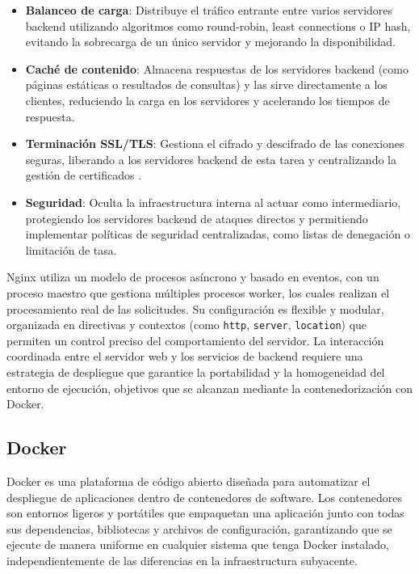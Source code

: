\documentclass{article}
\begin{document}
\begin{itemize}
\item \textbf{Balanceo de carga}: Distribuye el tráfico entrante entre varios servidores backend utilizando algoritmos como round-robin, least connections o IP hash, evitando la sobrecarga de un único servidor y mejorando la disponibilidad.
\item \textbf{Caché de contenido}: Almacena respuestas de los servidores backend (como páginas estáticas o resultados de consultas) y las sirve directamente a los clientes, reduciendo la carga en los servidores y acelerando los tiempos de respuesta.
\item \textbf{Terminación SSL/TLS}: Gestiona el cifrado y descifrado de las conexiones seguras, liberando a los servidores backend de esta tarea y centralizando la gestión de certificados .
\item \textbf{Seguridad}: Oculta la infraestructura interna al actuar como intermediario, protegiendo los servidores backend de ataques directos y permitiendo implementar políticas de seguridad centralizadas, como listas de denegación o limitación de tasa.

\end{itemize}

Nginx utiliza un modelo de procesos asíncrono y basado en eventos, con un proceso maestro que gestiona múltiples procesos worker, los cuales realizan el procesamiento real de las solicitudes. Su configuración es flexible y modular, organizada en directivas y contextos (como \texttt{http}, \texttt{server}, \texttt{location}) que permiten un control preciso del comportamiento del servidor.
La interacción coordinada entre el servidor web y los servicios de backend requiere una estrategia de despliegue que garantice la portabilidad y la homogeneidad del entorno de ejecución, objetivos que se alcanzan mediante la contenedorización con Docker.

\subsection{Docker}

Docker\cite{docker} es una plataforma de código abierto diseñada para automatizar el despliegue de aplicaciones dentro de contenedores de software. Los contenedores son entornos ligeros y portátiles que empaquetan una aplicación junto con todas sus dependencias, bibliotecas y archivos de configuración, garantizando que se ejecute de manera uniforme en cualquier sistema que tenga Docker instalado, independientemente de las diferencias en la infraestructura subyacente.
\end{document}
